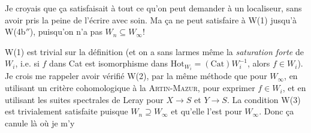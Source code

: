 \documentclass[11pt]{article}
\begin{document}
Je croyais que ça satisfaisait à tout ce qu'on peut demander à un localiseur, sans avoir pris la peine de l'écrire avec soin. Ma ça ne peut satisfaire à W(1) jusqu'à W(4b$''$), puisqu'on %
n'a pas $W_n \subseteq W_\infty$!

W(1) est trivial sur la définition (et on a sans larmes même la \textit{saturation forte} de $W_i$, %
i.e. si $f$ dans Cat est isomorphisme dans $\mathrm{Hot}_{W_i} = (\mathrm{Cat})W_i^{-1}$, alors $f \in W_i$). Je crois me rappeler avoir vérifié W(2), par la même méthode que pour $W_\infty$, en utilisant un critère cohomologique à la \textsc{Artin-Mazur}, pour exprimer $f \in W_i$, et en utilisant les suites spectrales de Leray pour $X \longrightarrow S$ et $Y \longrightarrow S$. La condition W(3) est trivialement satisfaite puisque $W_n \supseteq W_\infty$ et qu'elle l'est pour $W_\infty$. Donc ça canule là où je m'y
\end{document}
